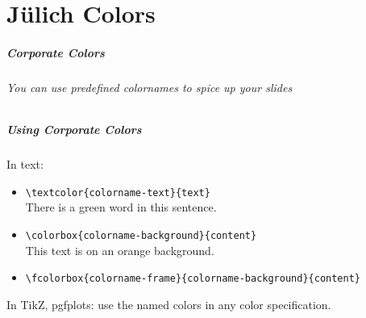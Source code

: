 \part{Jülich Colors}
\makepart

\begin{frame}[label=colors]
  \frametitle{Corporate Colors}
  \framesubtitle{You can use predefined colornames to spice up your slides}
  \centering
\end{frame}

\begin{frame}[fragile]
    \frametitle{Using Corporate Colors}
    In text:
    \begin{itemize}
        \item \verb+\textcolor{colorname-text}{text}+\\
            There is a \textcolor{fzjgreen}{green} word in this sentence.
        \item \verb+\colorbox{colorname-background}{content}+\\
            \colorbox{fzjorange}{This text is on an \textcolor{fzjred}{orange} background.}
        \item \verb+\fcolorbox{colorname-frame}{colorname-background}{content}+\\
    \end{itemize}

    In TikZ, pgfplots: use the named colors in any color specification.
\end{frame}
